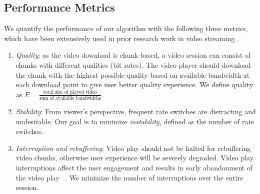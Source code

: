 \subsection{Performance Metrics}\label{subsec:metrics}

We quantify the performance of our algorithm with the following three
metrics, which have been extensively used in prior research work in video
streaming 
\cite{Qava, Avis,VideoMeasurement, Festive}. 


\begin{enumerate}
\item\textit{Quality}: as the video download is chunk-based, a video
  session can consist of chunks with different qualities (bit
  rates). The video player should download the chunk with the highest
  possible quality based on available bandwidth at each download point
  to give user better quality experience. We define quality as 
  $E = \frac{\mbox{total size of played video}}{\mbox{sum of available bandwidths}}$.

\item\textit{Stability}: From viewer's perspective, frequent rate
  switches are distracting and undesirable. Our goal is to minimize 
  \emph{instability}, defined as the number of rate switches.
  
\item\textit{Interruption and rebuffering}: Video play should not be
  halted for rebuffering video chunks, otherwise user experience will
  be severely degraded. Video play interruptions affect the user
  engagement and results in early abandonment of the video play
  ~\cite{VideoMeasurement}. We minimize the 
  number of interruptions over the entire session. %
\end{enumerate}


